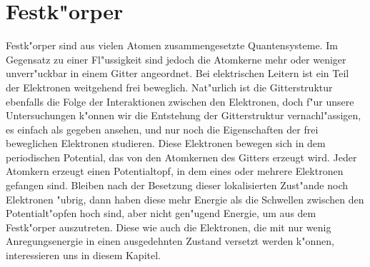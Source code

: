 \chapter{Festk"orper\label{chapter:festkoerper}}
\rhead{}
Festk"orper sind aus vielen Atomen zusammengesetzte Quantensysteme.
Im Gegensatz zu einer Fl"ussigkeit sind jedoch die Atomkerne mehr
oder weniger unverr"uckbar in einem Gitter angeordnet.
Bei elektrischen Leitern ist ein Teil der Elektronen weitgehend frei
beweglich.
Nat"urlich ist die Gitterstruktur ebenfalls die Folge der Interaktionen
zwischen den Elektronen, doch f"ur unsere Untersuchungen k"onnen wir
die Entstehung der Gitterstruktur vernachl"assigen, es einfach als
gegeben ansehen, und nur noch die Eigenschaften der frei beweglichen
Elektronen studieren.
Diese Elektronen bewegen sich in dem periodischen Potential, das von
den Atomkernen des Gitters erzeugt wird.
Jeder Atomkern erzeugt einen Potentialtopf, in dem eines oder mehrere
Elektronen gefangen sind.
Bleiben nach der Besetzung dieser lokalisierten Zust"ande noch
Elektronen "ubrig, dann haben diese mehr Energie als die Schwellen zwischen
den Potentialt"opfen hoch sind, aber nicht gen"ugend Energie, um
aus dem Festk"orper auszutreten.
Diese wie auch die Elektronen, die mit nur wenig Anregungsenergie
in einen ausgedehnten Zustand versetzt werden k"onnen, interessieren
uns in diesem Kapitel.

